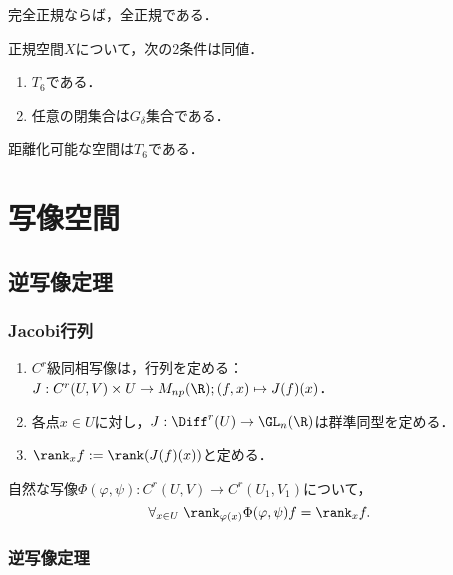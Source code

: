 \documentclass[uplatex,dvipdfmx]{jsreport}
\begin{document}
\begin{proposition}
    完全正規ならば，全正規である．
\end{proposition}

\begin{proposition}
    正規空間$X$について，次の2条件は同値．
    \begin{enumerate}
        \item $T_6$である．
        \item 任意の閉集合は$G_\delta$集合である．
    \end{enumerate}
\end{proposition}

\begin{proposition}
    距離化可能な空間は$T_6$である．
\end{proposition}

\chapter{写像空間}

\section{逆写像定理}

\subsection{Jacobi行列}

\begin{definition}[Jacobi行列]\mbox{}
    \begin{enumerate}
        \item $C^r$級同相写像は，行列を定める：$J:C^r(U,V)\times U\to M_{np}(\R);(f,x)\mapsto J(f)(x)$．
        \item 各点$x\in U$に対し，$J:\Diff^r(U)\to\GL_n(\R)$は群準同型を定める．
        \item $\rank_xf:=\rank(J(f)(x))$と定める．
    \end{enumerate}
\end{definition}

\begin{lemma}
    自然な写像$\Phi(\varphi,\psi):C^r(U,V)\to C^r(U_1,V_1)$について，
    \[\forall_{x\in U}\;\rank_{\varphi(x)}\Phi(\varphi,\psi)f=\rank_xf.\]
\end{lemma}

\subsection{逆写像定理}
\end{document}
